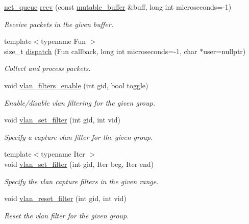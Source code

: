 \begin{DoxyCompactItemize}
\hyperlink{classpfq_1_1net__queue}{net\+\_\+queue} \hyperlink{classpfq_1_1socket_a57643b9011269682bf716254c2b72907}{recv} (const \hyperlink{namespacepfq_ad7b88920eaf729154354741132483ea8}{mutable\+\_\+buffer} \&buff, long int microseconds=-\/1)
\begin{DoxyCompactList}\small\item\em Receive packets in the given buffer. \end{DoxyCompactList}\item 
{\footnotesize template$<$typename Fun $>$ }\\size\+\_\+t \hyperlink{classpfq_1_1socket_ae6cd08be2e7c35a548a64fded4359612}{dispatch} (Fun callback, long int microseconds=-\/1, char $\ast$user=nullptr)
\begin{DoxyCompactList}\small\item\em Collect and process packets. \end{DoxyCompactList}\item 
void \hyperlink{classpfq_1_1socket_aaf91b2e089edb2c4695584b01774326e}{vlan\+\_\+filters\+\_\+enable} (int gid, bool toggle)
\begin{DoxyCompactList}\small\item\em Enable/disable vlan filtering for the given group. \end{DoxyCompactList}\item 
void \hyperlink{classpfq_1_1socket_a92eeaf78ff595546c517b5699c9a5b1e}{vlan\+\_\+set\+\_\+filter} (int gid, int vid)
\begin{DoxyCompactList}\small\item\em Specify a capture vlan filter for the given group. \end{DoxyCompactList}\item 
{\footnotesize template$<$typename Iter $>$ }\\void \hyperlink{classpfq_1_1socket_aee0fbc6a5f899d081c659dbaa4a4a235}{vlan\+\_\+set\+\_\+filter} (int gid, Iter beg, Iter end)
\begin{DoxyCompactList}\small\item\em Specify the vlan capture filters in the given range. \end{DoxyCompactList}\item 
void \hyperlink{classpfq_1_1socket_a296d1eddfb061c1a658067006ddb9f37}{vlan\+\_\+reset\+\_\+filter} (int gid, int vid)
\begin{DoxyCompactList}\small\item\em Reset the vlan filter for the given group. \end{DoxyCompactList}\item 

\end{DoxyCompactItemize}
